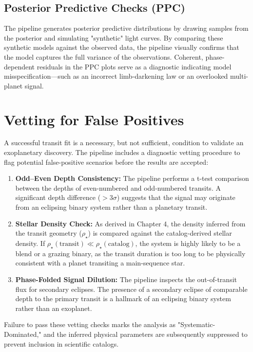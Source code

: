 \documentclass[12pt,a4paper,oneside]{report}
\newcommand{\rhoStar}{\ensuremath{\rho_{\star}}}
\begin{document}
\subsection{Posterior Predictive Checks (PPC)}
The pipeline generates posterior predictive distributions by drawing samples from the posterior and simulating "synthetic" light curves. By comparing these synthetic models against the observed data, the pipeline visually confirms that the model captures the full variance of the observations. Coherent, phase-dependent residuals in the PPC plots serve as a diagnostic indicating model misspecification—such as an incorrect limb-darkening law or an overlooked multi-planet signal.

\section{Vetting for False Positives}
A successful transit fit is a necessary, but not sufficient, condition to validate an exoplanetary discovery. The pipeline includes a diagnostic vetting procedure to flag potential false-positive scenarios before the results are accepted:
\begin{enumerate}
    \item \textbf{Odd--Even Depth Consistency:} The pipeline performs a t-test comparison between the depths of even-numbered and odd-numbered transits. A significant depth difference (\(>3\sigma\)) suggests that the signal may originate from an eclipsing binary system rather than a planetary transit.
    \item \textbf{Stellar Density Check:} As derived in Chapter 4, the density inferred from the transit geometry (\rhoStar) is compared against the catalog-derived stellar density. If \(\rhoStar (\mathrm{transit}) \ll \rhoStar (\mathrm{catalog})\), the system is highly likely to be a blend or a grazing binary, as the transit duration is too long to be physically consistent with a planet transiting a main-sequence star.
    \item \textbf{Phase-Folded Signal Dilution:} The pipeline inspects the out-of-transit flux for secondary eclipses. The presence of a secondary eclipse of comparable depth to the primary transit is a hallmark of an eclipsing binary system rather than an exoplanet.
\end{enumerate}
Failure to pass these vetting checks marks the analysis as "Systematic-Dominated," and the inferred physical parameters are subsequently suppressed to prevent inclusion in scientific catalogs.
\end{document}
